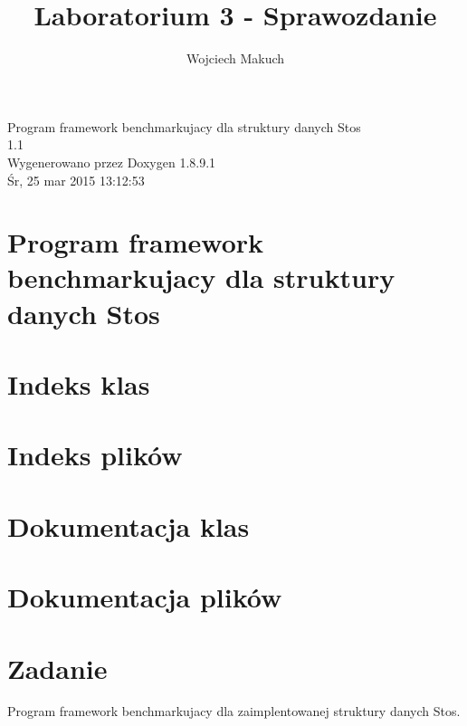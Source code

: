 \documentclass[twoside]{article}
\newcommand{\+}{\discretionary{\mbox{\scriptsize$\hookleftarrow$}}{}{}}
\begin{document}
\hypersetup{pageanchor=false,
             bookmarks=true,
             bookmarksnumbered=true,
             pdfencoding=unicode
            }
\begin{titlepage}
\vspace*{7cm}
\begin{center}%
{\Large Program framework benchmarkujacy dla struktury danych Stos \\[1ex]\large 1.\+1 }\\
\vspace*{1cm}
{\large Wygenerowano przez Doxygen 1.8.9.1}\\
\vspace*{0.5cm}
{\small Śr, 25 mar 2015 13:12:53}\\
\end{center}
\end{titlepage}
\tableofcontents
{}
\hypersetup{pageanchor=true}

\section{Program framework benchmarkujacy dla struktury danych Stos}
\label{index}\hypertarget{index}{}
\section{Indeks klas}

\section{Indeks plików}

\section{Dokumentacja klas}



\section{Dokumentacja plików}







\title{Laboratorium 3 - Sprawozdanie}
\author{Wojciech Makuch}

\maketitle
\section{Zadanie}
Program framework benchmarkujacy dla zaimplentowanej struktury danych Stos.
\end{document}
